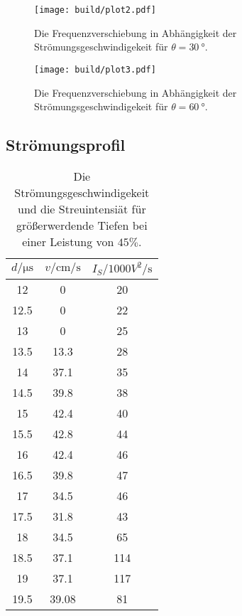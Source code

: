 \begin{figure}[H]
	\texttt{[image: build/plot2.pdf]}
	\caption{Die Frequenzverschiebung in Abhängigkeit der Strömungsgeschwindigekeit für $\theta = \qty{30}{°}$.}
	\label{fig:plot2}
\end{figure}

\begin{figure}[H]
	\texttt{[image: build/plot3.pdf]}
	\caption{Die Frequenzverschiebung in Abhängigkeit der Strömungsgeschwindigekeit für $\theta = \qty{60}{°}$.}
	\label{fig:plot3}
\end{figure}

\subsection{Strömungsprofil}
\label{sec:Strömungsprofil}

\begin{table}[H]
    \centering
    \caption{Die Strömungsgeschwindigekeit und die Streuintensiät für größerwerdende Tiefen bei einer Leistung von $45 \%$.}
\begin{tabular}{c c c}
    \toprule
    $d / \si{\micro\second}$ & $ v / \si{\centi \meter \per \second}$ & $I_S / 1000 \si{ V^2 \per \second} $\\
    \midrule
      12 &     0 &  20 \\
    12.5 &     0 &  22 \\
      13 &     0 &  25 \\
    13.5 &  13.3 &  28 \\
      14 &  37.1 &  35 \\
    14.5 &  39.8 &  38 \\
      15 &  42.4 &  40 \\
    15.5 &  42.8 &  44 \\
      16 &  42.4 &  46 \\
    16.5 &  39.8 &  47 \\
      17 &  34.5 &  46 \\
    17.5 &  31.8 &  43 \\
      18 &  34.5 &  65 \\
    18.5 &  37.1 & 114 \\
      19 &  37.1 & 117 \\
    19.5 & 39.08 &  81 \\
    \bottomrule
    \end{tabular}
\end{table}

